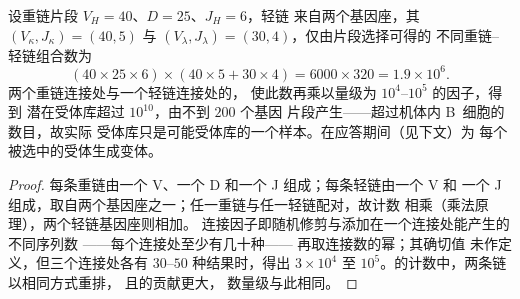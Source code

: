\begin{theorem}[受体库的大小]\label{thm:b3:adaptive-immunity:repertoire}
设重链片段 $V_{H} = 40$、$D = 25$、$J_{H} = 6$，轻链
来自两个基因座，其 $(V_{\kappa}, J_{\kappa}) = (40, 5)$ 与
$(V_{\lambda}, J_{\lambda}) = (30, 4)$，仅由片段选择可得的
不同重链–轻链组合数为
\[
(40\times 25\times 6)\times(40\times 5 + 30\times 4) = 6000\times 320
= 1.9\times 10^{6}.
\]
两个重链连接处与一个轻链连接处的，
使此数再乘以量级为 $10^{4}$--$10^{5}$ 的因子，得到
潜在受体库超过 $10^{10}$，由不到 $200$ 个基因
片段产生——超过机体内 B~细胞的数目，故实际
受体库只是可能受体库的一个样本。在应答期间（见下文）为
每个被选中的受体生成变体。
\end{theorem}
\begin{proof}
每条重链由一个 V、一个 D 和一个 J 组成；每条轻链由一个 V 和
一个 J 组成，取自两个基因座之一；任一重链与任一轻链配对，故计数
相乘（乘法原理），两个轻链基因座则相加。
连接因子即随机修剪与添加在一个连接处能产生的不同序列数
——每个连接处至少有几十种——
再取连接数的幂；其确切值
未作定义，但三个连接处各有 $30$--$50$ 种结果时，得出
$3\times 10^{4}$ 至 $10^{5}$。的计数中，两条链以相同方式重排，
且的贡献更大，
数量级与此相同。
\end{proof}

